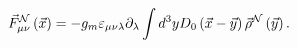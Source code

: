 \begin{equation}
\label{F}
\vec F_{\mu\nu}^{\cal N}\left(\vec x\right)=-g_m\varepsilon_{\mu\nu\lambda}\partial_\lambda\int d^3y D_0\left(\vec x-\vec y\right)
\vec\rho^{\cal N}\left(\vec y\right).
\end{equation}

